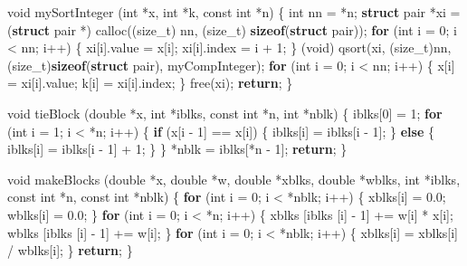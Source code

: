 \documentclass[12pt,]{article}
\newenvironment{Shaded}{\begin{snugshade}}{\end{snugshade}}
\newcommand{\KeywordTok}[1]{\textcolor[rgb]{0.13,0.29,0.53}{\textbf{{#1}}}}
\newcommand{\DataTypeTok}[1]{\textcolor[rgb]{0.13,0.29,0.53}{{#1}}}
\newcommand{\DecValTok}[1]{\textcolor[rgb]{0.00,0.00,0.81}{{#1}}}
\newcommand{\FloatTok}[1]{\textcolor[rgb]{0.00,0.00,0.81}{{#1}}}
\newcommand{\NormalTok}[1]{{#1}}
\begin{document}
\begin{Shaded}
\begin{Highlighting}[]
\DataTypeTok{void} \NormalTok{mySortInteger (}\DataTypeTok{int} \NormalTok{*x, }\DataTypeTok{int} \NormalTok{*k, }\DataTypeTok{const} \DataTypeTok{int} \NormalTok{*n) \{}
    \DataTypeTok{int} \NormalTok{nn = *n;}
    \KeywordTok{struct} \NormalTok{pair *xi =}
        \NormalTok{(}\KeywordTok{struct} \NormalTok{pair *) calloc((size_t) nn, (size_t) }\KeywordTok{sizeof}\NormalTok{(}\KeywordTok{struct} \NormalTok{pair));}
    \KeywordTok{for} \NormalTok{(}\DataTypeTok{int} \NormalTok{i = }\DecValTok{0}\NormalTok{; i < nn; i++) \{}
        \NormalTok{xi[i].value = x[i];}
        \NormalTok{xi[i].index = i + }\DecValTok{1}\NormalTok{;}
    \NormalTok{\}}
    \NormalTok{(}\DataTypeTok{void}\NormalTok{) qsort(xi, (size_t)nn, (size_t)}\KeywordTok{sizeof}\NormalTok{(}\KeywordTok{struct} \NormalTok{pair), myCompInteger);}
    \KeywordTok{for} \NormalTok{(}\DataTypeTok{int} \NormalTok{i = }\DecValTok{0}\NormalTok{; i < nn; i++) \{}
        \NormalTok{x[i] = xi[i].value;}
        \NormalTok{k[i] = xi[i].index;}
    \NormalTok{\}}
    \NormalTok{free(xi);}
    \KeywordTok{return}\NormalTok{;}
\NormalTok{\}}

\DataTypeTok{void} \NormalTok{tieBlock (}\DataTypeTok{double} \NormalTok{*x, }\DataTypeTok{int} \NormalTok{*iblks, }\DataTypeTok{const} \DataTypeTok{int} \NormalTok{*n, }\DataTypeTok{int} \NormalTok{*nblk) \{}
    \NormalTok{iblks[}\DecValTok{0}\NormalTok{] = }\DecValTok{1}\NormalTok{;}
    \KeywordTok{for} \NormalTok{(}\DataTypeTok{int} \NormalTok{i = }\DecValTok{1}\NormalTok{; i < *n; i++) \{}
        \KeywordTok{if} \NormalTok{(x[i - }\DecValTok{1}\NormalTok{] == x[i]) \{}
            \NormalTok{iblks[i] = iblks[i - }\DecValTok{1}\NormalTok{];}
        \NormalTok{\} }\KeywordTok{else} \NormalTok{\{}
            \NormalTok{iblks[i] = iblks[i - }\DecValTok{1}\NormalTok{] + }\DecValTok{1}\NormalTok{;}
        \NormalTok{\}}
    \NormalTok{\}}
    \NormalTok{*nblk = iblks[*n - }\DecValTok{1}\NormalTok{];}
    \KeywordTok{return}\NormalTok{;}
\NormalTok{\}}

\DataTypeTok{void} \NormalTok{makeBlocks (}\DataTypeTok{double} \NormalTok{*x, }\DataTypeTok{double} \NormalTok{*w, }\DataTypeTok{double} \NormalTok{*xblks, }\DataTypeTok{double} \NormalTok{*wblks, }\DataTypeTok{int} \NormalTok{*iblks, }\DataTypeTok{const} \DataTypeTok{int} \NormalTok{*n, }\DataTypeTok{const} \DataTypeTok{int} \NormalTok{*nblk) \{}
    \KeywordTok{for} \NormalTok{(}\DataTypeTok{int} \NormalTok{i = }\DecValTok{0}\NormalTok{; i < *nblk; i++) \{}
        \NormalTok{xblks[i] = }\FloatTok{0.0}\NormalTok{;}
        \NormalTok{wblks[i] = }\FloatTok{0.0}\NormalTok{;}
    \NormalTok{\}}
    \KeywordTok{for} \NormalTok{(}\DataTypeTok{int} \NormalTok{i = }\DecValTok{0}\NormalTok{; i < *n; i++) \{}
        \NormalTok{xblks [iblks [i] - }\DecValTok{1}\NormalTok{] += w[i] * x[i];}
        \NormalTok{wblks [iblks [i] - }\DecValTok{1}\NormalTok{] += w[i];}
    \NormalTok{\}}
    \KeywordTok{for} \NormalTok{(}\DataTypeTok{int} \NormalTok{i = }\DecValTok{0}\NormalTok{; i < *nblk; i++) \{}
        \NormalTok{xblks[i] = xblks[i] / wblks[i];}
    \NormalTok{\}}
    \KeywordTok{return}\NormalTok{;}
\NormalTok{\}}


\end{Highlighting}
\end{Shaded}
\end{document}
